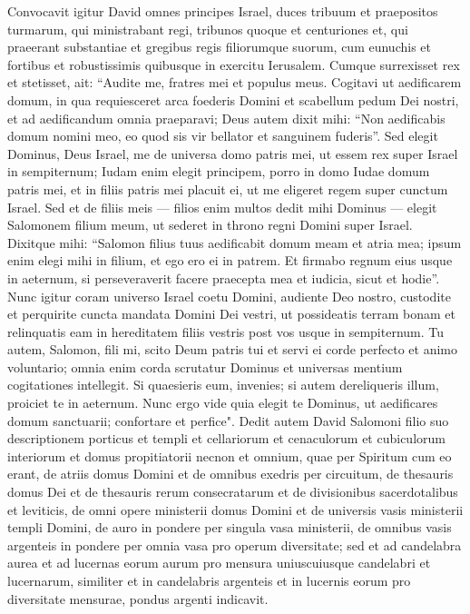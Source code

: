 \begin{biblechapter}  
\verse Convocavit igitur David omnes principes Israel, duces tribuum et praepositos turmarum, qui ministrabant regi, tribunos quoque et centuriones et, qui praeerant substantiae et gregibus regis filiorumque suorum, cum eunuchis et fortibus et robustissimis quibusque in exercitu Ierusalem. 
\verse Cumque surrexisset rex et stetisset, ait: “Audite me, fratres mei et populus meus. Cogitavi ut aedificarem domum, in qua requiesceret arca foederis Domini et scabellum pedum Dei nostri, et ad aedificandum omnia praeparavi; 
\verse Deus autem dixit mihi: “Non aedificabis domum nomini meo, eo quod sis vir bellator et sanguinem fuderis”. 
\verse Sed elegit Dominus, Deus Israel, me de universa domo patris mei, ut essem rex super Israel in sempiternum; Iudam enim elegit principem, porro in domo Iudae domum patris mei, et in filiis patris mei placuit ei, ut me eligeret regem super cunctum Israel. 
\verse Sed et de filiis meis — filios enim multos dedit mihi Dominus — elegit Salomonem filium meum, ut sederet in throno regni Domini super Israel. 
\verse Dixitque mihi: “Salomon filius tuus aedificabit domum meam et atria mea; ipsum enim elegi mihi in filium, et ego ero ei in patrem. 
\verse Et firmabo regnum eius usque in aeternum, si perseveraverit facere praecepta mea et iudicia, sicut et hodie”. 
\verse Nunc igitur coram universo Israel coetu Domini, audiente Deo nostro, custodite et perquirite cuncta mandata Domini Dei vestri, ut possideatis terram bonam et relinquatis eam in hereditatem filiis vestris post vos usque in sempiternum. 
\verse Tu autem, Salomon, fili mi, scito Deum patris tui et servi ei corde perfecto et animo voluntario; omnia enim corda scrutatur Dominus et universas mentium cogitationes intellegit. Si quaesieris eum, invenies; si autem dereliqueris illum, proiciet te in aeternum. 
\verse Nunc ergo vide quia elegit te Dominus, ut aedificares domum sanctuarii; confortare et perfice". 
\verse Dedit autem David Salomoni filio suo descriptionem porticus et templi et cellariorum et cenaculorum et cubiculorum interiorum et domus propitiatorii  
\verse necnon et omnium, quae per Spiritum cum eo erant, de atriis domus Domini et de omnibus exedris per circuitum, de thesauris domus Dei et de thesauris rerum consecratarum 
\verse et de divisionibus sacerdotalibus et leviticis, de omni opere ministerii domus Domini et de universis vasis ministerii templi Domini,  
\verse de auro in pondere per singula vasa ministerii, de omnibus vasis argenteis in pondere per omnia vasa pro operum diversitate; 
\verse sed et ad candelabra aurea et ad lucernas eorum aurum pro mensura uniuscuiusque candelabri et lucernarum, similiter et in candelabris argenteis et in lucernis eorum pro diversitate mensurae, pondus argenti indicavit. 

\end{biblechapter}
